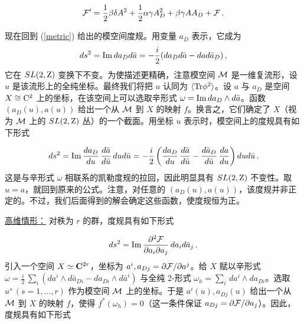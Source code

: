 $$
{\cal F}'=\frac{1}{2}\beta\delta A^2 +\frac{1}{2}\alpha\gamma A^2_D
+\beta\gamma A A_D + {\cal F}\,.
$$

现在回到 (\ref{metric}) 给出的模空间度规。用变量 $a_D$ 表示，它成为
$$
ds^2={\rm Im}\,da_D d\bar{a}=-\frac{i}{2}(da_D d\bar{a}-da d\bar{a}_D)\,,
$$
它在 $SL(2,{\rm Z})$ 变换下不变。为使描述更精确，注意模空间 ${\cal M}$ 是一维复流形，设 $u$ 是该流形上的全纯坐标。最终我们将把 $u$ 认同为 $\langle{\rm Tr}\phi^2\rangle$。设 $a$ 与 $a_D$ 是空间 $X \cong {\rm C}^2$ 上的坐标，在该空间上可以选取辛形式 $\omega={\rm Im}\,da_D\wedge d\bar{a}$。函数 $(a_{D}(u),a(u))$ 给出一个从 ${\cal M}$ 到 $X$ 的映射 $f$。换言之，它们确定了 $X$（视为 ${\cal M}$ 上的 $SL(2,{\rm Z})$ 丛）的一个截面。用坐标 $u$ 表示时，模空间上的度规具有如下形式

$$
ds^2 ={\rm Im}\,\frac{da_D}{du}\,\frac{d \bar{a}}{d\bar{u}}\,
dud\bar{u}=-\frac{i}{2}\left(\frac{da_{D}}{du}\,\frac{d\bar{a}}{d\bar{u}}
-\frac{d\bar{a}_D}{d\bar{u}}\,\frac{da}{du}\right)dud\bar{u}\,.
$$
这是与辛形式 $\omega$ 相联系的凯勒度规的拉回，因此明显具有 $SL(2,{\rm Z})$ 不变性。取 $u=a$，就回到原来的公式。注意，对任意的 $(a_D(u),a(u))$，该度规并非正定的。不过，我们后面得到的解会确定这些函数，使度规恒为正。


\noindent\underline{高维情形：}
{}对秩为 $r$ 的群，度规具有如下形式

$$
ds^2 ={\rm Im}\,\frac{\partial^2{\cal F}}{\partial a_i\partial a_j}\, 
da_i d\bar{a}_j\,.
$$
引入一个空间 $X \simeq {\bf C}^{2r}$，坐标为 $a^{i}, a_{Dj}=\partial {\cal F}/\partial a^{j}$。给 $X$ 赋以辛形式 $\omega=\frac{i}{2}\,\sum_{i}(da^i\wedge d\bar{a}_{Di}-da_{Di} \wedge d\bar{a}^i)$ 与全纯 2-形式 $\omega_h =\sum_{i} \, da^{i} \wedge da_{Di}$。选取 $u^s\, (s=1,...,r)$ 作为模空间 ${\cal M}$ 上的坐标。于是 $a^i(u),a_{Dj}(u)$ 给出一个从 ${\cal M}$ 到 $X$ 的映射 $f$，使得 $f^{*}(\omega_{h}) = 0$（这一条件保证 $a_{Dj}=\partial {\cal F}/\partial a_{j}$）。因此，度规具有如下形式

